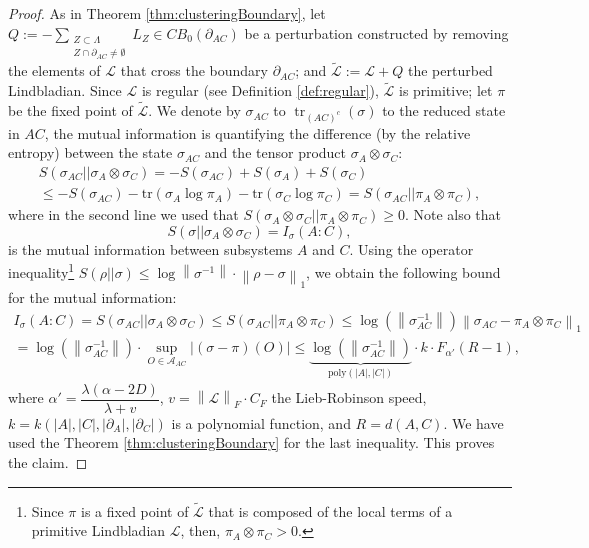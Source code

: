 \documentclass[11pt]{article}
\numberwithin{equation}{section}
\numberwithin{figure}{section}
\numberwithin{table}{section}
\theoremstyle{definition}
\theoremstyle{plain}
\theoremstyle{remark}
\newcommand{\Li}{\mathcal{L}}
\newcommand{\LL}{\widetilde{\Li}}
\newcommand{\A}{\mathcal{A}}
\newcommand{\norm}[1]{\left\lVert#1\right\rVert}
\newcommand{\normm}[2]{\left\lVert#1\right\rVert_{#2}}
\newcommand{\tr}{\operatorname{tr}}
\newcommand{\poly}{\mathrm{poly}}
\newcommand{\abs}[1]{\left \vert#1\right\vert}
\begin{document}
\begin{proof}

    As in Theorem \ref{thm:clusteringBoundary}, let $Q:=-\sum\limits_{\substack{Z\subset \Lambda \\ Z\cap \partial_{AC}\neq \emptyset}}L_Z\in CB_0(\partial_{AC})$ be a perturbation constructed by removing the elements of $\Li$ that cross the boundary $\partial_{AC}$; and $\LL:=\Li+ Q $ the perturbed Lindbladian. Since $\Li$ is regular (see Definition \ref{def:regular}), $\LL$ is primitive; let $\pi$ be the fixed point of $\LL$. We denote by $\sigma_{AC}$ to $\tr_{(AC)^c}(\sigma)$ to the reduced state in $AC$, the mutual information is quantifying the difference (by the relative entropy) between the state $\sigma_{AC}$ and the tensor product $\sigma_A\otimes \sigma_C$:
    \begin{multline}
        S(\sigma_{AC} ||\sigma_A\otimes\sigma_C) =- S(\sigma_{AC})+S(\sigma_A)+S(\sigma_C)\\
        \leq -S(\sigma_{AC})-\text{tr}(\sigma_A \log\pi_A)-\text{tr}(\sigma_C \log \pi_C) =S(\sigma_{AC}||\pi_A\otimes\pi_C),
    \end{multline}
    where in the second line we used that $S(\sigma_{A}\otimes \sigma_C||\pi_{A}\otimes \pi_C)\geq 0$. Note also that \[S(\sigma ||\sigma_A\otimes\sigma_C)={I_\sigma(A:C)},\]is the mutual information between subsystems $A$ and $C$. Using the operator inequality\footnote{Since $\pi$ is a fixed point of $\tilde{\Li}$ that is composed of the local terms of a primitive Lindbladian $\Li$, then, $\pi_A\otimes\pi_C >0$.} $S(\rho ||\sigma)\leq \log \norm{\sigma^{-1}}\cdot \normm{\rho-\sigma}{1}$, we obtain the following bound for the mutual information:
    \begin{multline}
        I_\sigma (A:C)=S(\sigma_{AC} ||\sigma_A\otimes\sigma_C)       \leq S(\sigma_{AC} ||\pi_A\otimes\pi_C)
        \leq \log(\norm{\sigma_{AC}^{-1}}) \normm{\sigma_{AC}-\pi_A\otimes \pi_C}{1}\\
        = \log(\norm{\sigma_{AC}^{-1}}) \cdot \sup_{O\in \A_{AC}} \abs{(\sigma-\pi)(O)} \leq \underbrace{\log(\norm{\sigma_{AC}^{-1}})}_{\poly(\abs{A},\abs{C})} \cdot k \cdot F_{\alpha '}(R-1),
        \label{eq:proofDecayMI}
    \end{multline}
     where $\alpha'=\dfrac{\lambda(\alpha-2D)}{\lambda +v}$, $v=\normm{\Li}{F}\cdot  C_F$ the Lieb-Robinson speed, $k=k(\abs{A},\abs{C},\abs{\partial_{A}},\abs{\partial_{C}})$ is a polynomial function, and $R=d(A,C)$. We have used the Theorem \ref{thm:clusteringBoundary} for the last inequality. This proves the claim.
\end{proof}
\end{document}
